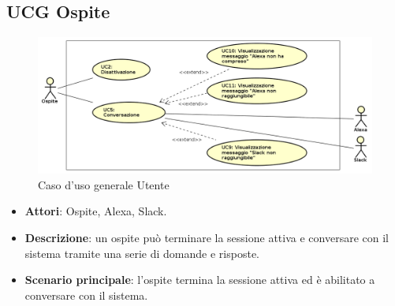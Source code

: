 \documentclass[../AnalisiDeiRequisiti_v4.0.0.tex]{subfiles}
\begin{document}
\subsection{UCG Ospite} 
\label{sssec:UCG_Ospite}
\begin{figure}[!h]
	\centering
	\includegraphics[width=\textwidth]{UseCases/UCG_Ospite/UCG_Ospite.png}
	\caption{Caso d'uso generale Utente}
\end{figure}
\begin{itemize} 
\item \textbf{Attori}: Ospite, Alexa, Slack.
\item \textbf{Descrizione}: un ospite può terminare la sessione attiva e conversare con il sistema tramite una serie di domande e risposte.
\item \textbf{Scenario principale}: l'ospite termina la sessione attiva ed è abilitato a conversare con il sistema.
\end{itemize}
\newpage
\end{document}
